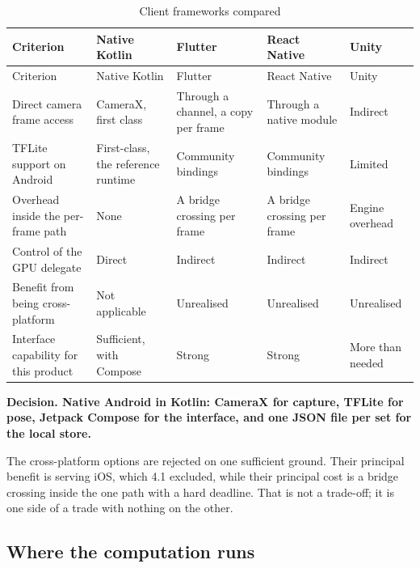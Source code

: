 {\footnotesize
\setlength{\LTpre}{6pt}\setlength{\LTpost}{8pt}
\begin{longtable}{>{\raggedright\arraybackslash}p{}>{\raggedright\arraybackslash}p{}>{\raggedright\arraybackslash}p{}>{\raggedright\arraybackslash}p{}>{\raggedright\arraybackslash}p{}}
\caption{Client frameworks compared}\\
\toprule
Criterion & Native Kotlin & Flutter & React Native & Unity \\
\midrule
\endfirsthead
\toprule
Criterion & Native Kotlin & Flutter & React Native & Unity \\
\midrule
\endhead
\bottomrule
\endfoot
\bottomrule
\endlastfoot
Direct camera frame access & CameraX, first class & Through a channel, a copy per frame & Through a native module & Indirect \\
TFLite support on Android & First-class, the reference runtime & Community bindings & Community bindings & Limited \\
Overhead inside the per-frame path & None & A bridge crossing per frame & A bridge crossing per frame & Engine overhead \\
Control of the GPU delegate & Direct & Indirect & Indirect & Indirect \\
Benefit from being cross-platform & Not applicable & Unrealised & Unrealised & Unrealised \\
Interface capability for this product & Sufficient, with Compose & Strong & Strong & More than needed \\
\end{longtable}
}

\textbf{Decision. Native Android in Kotlin: CameraX for capture, TFLite for pose, Jetpack Compose for the interface, and one JSON file per set for the local store.}

The cross-platform options are rejected on one sufficient ground. Their principal benefit is serving iOS, which 4.1 excluded, while their principal cost is a bridge crossing inside the one path with a hard deadline. That is not a trade-off; it is one side of a trade with nothing on the other.

\subsection{Where the computation runs}
\label{sec:4.3.2}

